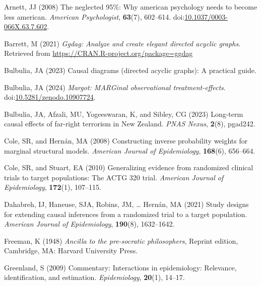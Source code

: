 \documentclass[
  single column]{article}
\newlength{\cslhangindent}
\newenvironment{CSLReferences}[2] %
 {\begin{list}{}{%
  \setlength{\itemindent}{0pt}
  \setlength{\leftmargin}{0pt}
  \setlength{\parsep}{0pt}
  \ifodd #1
   \setlength{\leftmargin}{\cslhangindent}
   \setlength{\itemindent}{-1\cslhangindent}
  \fi
  \setlength{\itemsep}{#2\baselineskip}}}
 {\end{list}}
\begin{document}
\label{refs}
\begin{CSLReferences}{1}{0}
Arnett, JJ (2008) The neglected 95\%: Why american psychology needs to
become less american. \emph{American Psychologist}, \textbf{63}(7),
602--614.
doi:\href{https://doi.org/10.1037/0003-066X.63.7.602}{10.1037/0003-066X.63.7.602}.

Barrett, M (2021) \emph{Ggdag: Analyze and create elegant directed
acyclic graphs}. Retrieved from
\url{https://CRAN.R-project.org/package=ggdag}

Bulbulia, JA (2023) Causal diagrams (directed acyclic graphs): A
practical guide.

Bulbulia, JA (2024) \emph{Margot: MARGinal observational
treatment-effects}.
doi:\href{https://doi.org/10.5281/zenodo.10907724}{10.5281/zenodo.10907724}.

Bulbulia, JA, Afzali, MU, Yogeeswaran, K, and Sibley, CG (2023)
Long-term causal effects of far-right terrorism in {N}ew {Z}ealand.
\emph{PNAS Nexus}, \textbf{2}(8), pgad242.

Cole, SR, and Hernán, MA (2008) Constructing inverse probability weights
for marginal structural models. \emph{American Journal of Epidemiology},
\textbf{168}(6), 656--664.

Cole, SR, and Stuart, EA (2010) Generalizing evidence from randomized
clinical trials to target populations: The ACTG 320 trial.
\emph{American Journal of Epidemiology}, \textbf{172}(1), 107--115.

Dahabreh, IJ, Haneuse, SJA, Robins, JM, \ldots{} Hernán, MA (2021) Study
designs for extending causal inferences from a randomized trial to a
target population. \emph{American Journal of Epidemiology},
\textbf{190}(8), 1632--1642.

Freeman, K (1948) \emph{Ancilla to the pre-socratic philosophers},
Reprint edition, Cambridge, MA: Harvard University Press.

Greenland, S (2009) Commentary: Interactions in epidemiology: Relevance,
identification, and estimation. \emph{Epidemiology}, \textbf{20}(1),
14--17.


\end{CSLReferences}
\end{document}
